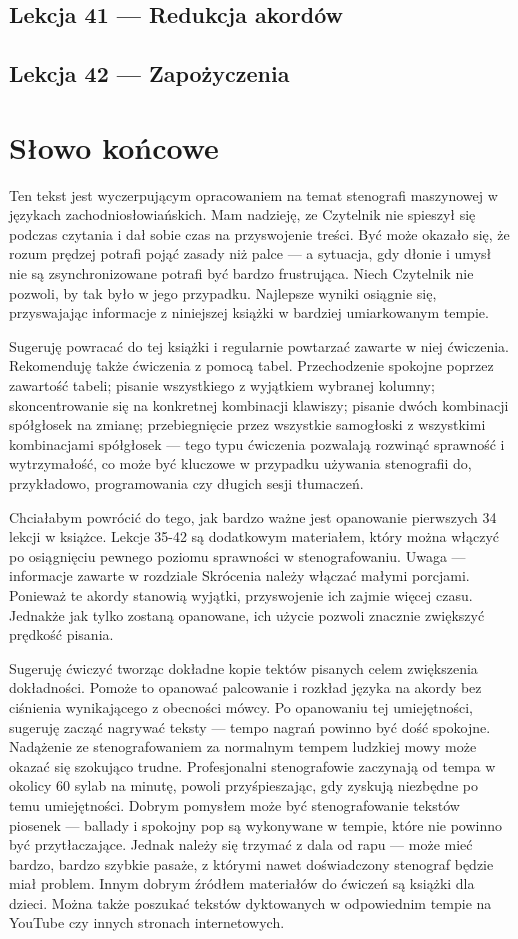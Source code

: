 \documentclass[12p, oneside]{book}
\begin{document}
\section{Lekcja 41 --- Redukcja akordów}
\newpage
\section{Lekcja 42 --- Zapożyczenia}
\newpage
\chapter{Słowo końcowe}
Ten tekst jest wyczerpującym opracowaniem na temat stenografi maszynowej w językach zachodniosłowiańskich. Mam nadzieję, ze Czytelnik nie spieszył się podczas czytania i dał sobie czas na przyswojenie treści. Być może okazało się, że rozum prędzej potrafi pojąć zasady niż palce --- a sytuacja, gdy dłonie i umysł nie są zsynchronizowane potrafi być bardzo frustrująca. Niech Czytelnik nie pozwoli, by tak było w jego przypadku. Najlepsze wyniki osiągnie się, przyswajając informacje z niniejszej książki w bardziej umiarkowanym tempie.

Sugeruję powracać do tej książki i regularnie powtarzać zawarte w niej ćwiczenia. Rekomenduję także ćwiczenia z pomocą tabel. Przechodzenie spokojne poprzez zawartość tabeli; pisanie wszystkiego z wyjątkiem wybranej kolumny; skoncentrowanie się na konkretnej kombinacji klawiszy; pisanie dwóch kombinacji spółgłosek na zmianę; przebiegnięcie przez wszystkie samogłoski z wszystkimi kombinacjami spółgłosek --- tego typu ćwiczenia pozwalają rozwinąć sprawność i wytrzymałość, co może być kluczowe w przypadku używania stenografii do, przykładowo, programowania czy długich sesji tłumaczeń.

Chciałabym powrócić do tego, jak bardzo ważne jest opanowanie pierwszych 34 lekcji w książce. Lekcje 35-42 są dodatkowym materiałem, który można włączyć po osiągnięciu pewnego poziomu sprawności w stenografowaniu. Uwaga --- informacje zawarte w rozdziale Skrócenia należy włączać małymi porcjami. Ponieważ te akordy stanowią wyjątki, przyswojenie ich zajmie więcej czasu. Jednakże jak tylko zostaną opanowane, ich użycie pozwoli znacznie zwiększyć prędkość pisania.

Sugeruję ćwiczyć tworząc dokładne kopie tektów pisanych celem zwiększenia dokładności. Pomoże to opanować palcowanie i rozkład języka na akordy bez ciśnienia wynikającego z obecności mówcy. Po opanowaniu tej umiejętności, sugeruję zacząć nagrywać teksty --- tempo nagrań powinno być dość spokojne. Nadążenie ze stenografowaniem za normalnym tempem ludzkiej mowy może okazać się szokująco trudne. Profesjonalni stenografowie zaczynają od tempa w okolicy 60 sylab na minutę, powoli przyśpieszając, gdy zyskują niezbędne po temu umiejętności. Dobrym pomysłem może być stenografowanie tekstów piosenek --- ballady i spokojny pop są wykonywane w tempie, które nie powinno być przytłaczające. Jednak należy się trzymać z dala od rapu --- może mieć bardzo, bardzo szybkie pasaże, z którymi nawet doświadczony stenograf będzie miał problem. Innym dobrym źródłem materiałów do ćwiczeń są książki dla dzieci. Można także poszukać tekstów dyktowanych w odpowiednim tempie na YouTube czy innych stronach internetowych.
\end{document}
